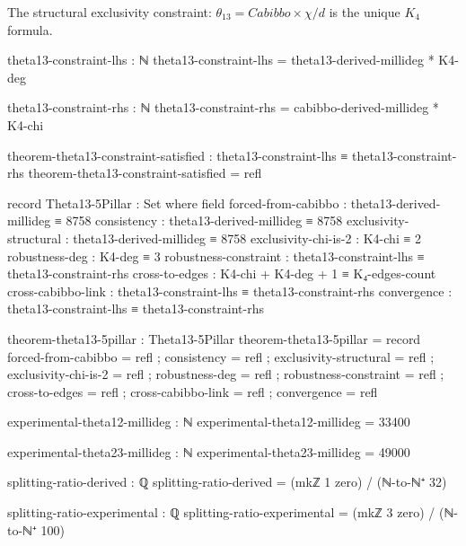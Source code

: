 \documentclass[11pt,a4paper]{book}
\def\text#1{#1}%
\begin{document}
The structural exclusivity constraint: $\theta_{13} = \text{Cabibbo} \times \chi/d$ is the unique $K_4$ formula.

\begin{code}
theta13-constraint-lhs : ℕ
theta13-constraint-lhs = theta13-derived-millideg * K4-deg

theta13-constraint-rhs : ℕ  
theta13-constraint-rhs = cabibbo-derived-millideg * K4-chi

theorem-theta13-constraint-satisfied : theta13-constraint-lhs ≡ theta13-constraint-rhs
theorem-theta13-constraint-satisfied = refl
\end{code}

\begin{code}
record Theta13-5Pillar : Set where
  field
    forced-from-cabibbo    : theta13-derived-millideg ≡ 8758
    consistency            : theta13-derived-millideg ≡ 8758
    exclusivity-structural : theta13-derived-millideg ≡ 8758
    exclusivity-chi-is-2   : K4-chi ≡ 2
    robustness-deg         : K4-deg ≡ 3
    robustness-constraint  : theta13-constraint-lhs ≡ theta13-constraint-rhs
    cross-to-edges         : K4-chi + K4-deg + 1 ≡ K₄-edges-count
    cross-cabibbo-link     : theta13-constraint-lhs ≡ theta13-constraint-rhs
    convergence            : theta13-constraint-lhs ≡ theta13-constraint-rhs

theorem-theta13-5pillar : Theta13-5Pillar
theorem-theta13-5pillar = record
  { forced-from-cabibbo    = refl
  ; consistency            = refl
  ; exclusivity-structural = refl
  ; exclusivity-chi-is-2   = refl
  ; robustness-deg         = refl
  ; robustness-constraint  = refl
  ; cross-to-edges         = refl
  ; cross-cabibbo-link     = refl
  ; convergence            = refl
  }
\end{code}

\begin{code}
experimental-theta12-millideg : ℕ
experimental-theta12-millideg = 33400

experimental-theta23-millideg : ℕ
experimental-theta23-millideg = 49000
\end{code}

\begin{code}
splitting-ratio-derived : ℚ
splitting-ratio-derived = (mkℤ 1 zero) / (ℕ-to-ℕ⁺ 32)
\end{code}

\begin{code}
splitting-ratio-experimental : ℚ
splitting-ratio-experimental = (mkℤ 3 zero) / (ℕ-to-ℕ⁺ 100)
\end{code}
\end{document}
